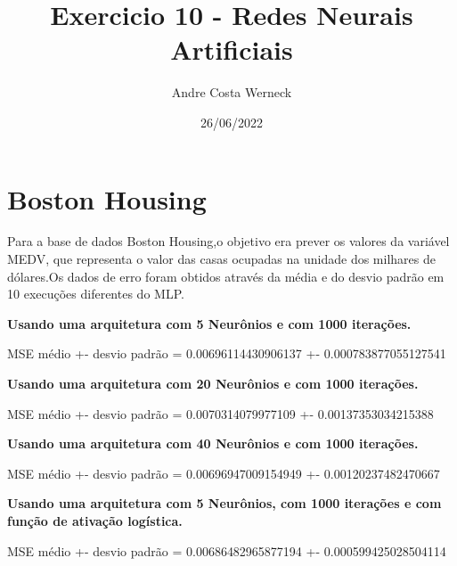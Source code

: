 \documentclass{article}
\begin{document}


\title{Exercicio 10 - Redes Neurais Artificiais}
\author{Andre Costa Werneck}
\date{26/06/2022}
\maketitle
\newpage

\section{Boston Housing}

Para a base de dados Boston Housing,o objetivo era prever os valores da variável MEDV, que representa o valor das casas ocupadas na unidade dos milhares de dólares.Os dados de erro foram obtidos através da média e do desvio padrão em 10 execuções diferentes do MLP. 



\textbf{Usando uma arquitetura com 5 Neurônios e com 1000 iterações.}

\begin{Schunk}
\begin{Soutput}
MSE médio +- desvio padrão = 0.00696114430906137 +- 0.000783877055127541
\end{Soutput}
\end{Schunk}

\textbf{Usando uma arquitetura com 20 Neurônios e com 1000 iterações.}

\begin{Schunk}
\begin{Soutput}
MSE médio +- desvio padrão = 0.0070314079977109 +- 0.00137353034215388
\end{Soutput}
\end{Schunk}


\textbf{Usando uma arquitetura com 40 Neurônios e com 1000 iterações.}

\begin{Schunk}
\begin{Soutput}
MSE médio +- desvio padrão = 0.00696947009154949 +- 0.00120237482470667
\end{Soutput}
\end{Schunk}

\textbf{Usando uma arquitetura com 5 Neurônios, com 1000 iterações e com função de ativação logística.}

\begin{Schunk}
\begin{Soutput}
MSE médio +- desvio padrão = 0.00686482965877194 +- 0.000599425028504114
\end{Soutput}
\end{Schunk}
\end{document}
